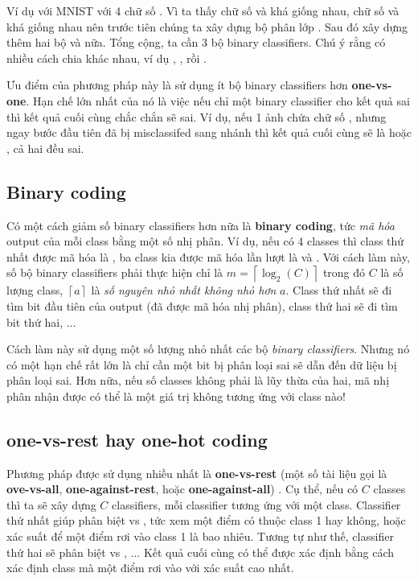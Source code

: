 Ví dụ với MNIST với 4 chữ số . Vì ta thấy chữ số  và  khá giống nhau, chữ số  và  khá giống nhau nên trước tiên chúng ta xây dựng bộ phân lớp . Sau đó xây dựng thêm hai bộ  và  nữa. Tổng cộng, ta cần 3 bộ binary classifiers. Chú ý rằng có nhiều cách chia khác nhau, ví dụ , , rồi .  
 
 
Ưu điểm của phương pháp này là sử dụng ít bộ binary classifiers hơn \textbf{one-vs-one}.  
Hạn chế lớn nhất của nó là việc nếu chỉ một binary classifier cho kết quả sai thì kết quả cuối cùng chắc chắn sẽ sai. Ví dụ, nếu 1 ảnh chứa chữ số , nhưng ngay bước đầu tiên đã bị misclassifed sang nhánh \pythoninline{[4, 7]} thì kết quả cuối cùng sẽ là  hoặc , cả hai đều sai.  
 
 
\subsection{Binary coding}
Có một cách giảm số binary classifiers hơn nữa là \textbf{binary coding}, tức \textit{mã hóa} output của mỗi class bằng một số nhị phân. Ví dụ, nếu có 4 classes thì class thứ nhất được mã hóa là , ba class kia được mã hóa lần lượt là  và . Với cách làm này, số bộ binary classifiers phải thực hiện chỉ là $m = \left\lceil\log_2(C)\right\rceil$ trong đó $C$ là số lượng class, $\left\lceil a \right\rceil$ là \textit{số nguyên nhỏ nhất không nhỏ hơn} $a$. Class thứ nhất sẽ đi tìm bit đầu tiên của output (đã được mã hóa nhị phân), class thứ hai sẽ đi tìm bit thứ hai, ... 
 
Cách làm này sử dụng một số lượng nhỏ nhất các bộ \textit{binary classifiers}. Nhưng nó có một hạn chế rất lớn là chỉ cần một bit bị phân loại sai sẽ dẫn đến dữ liệu bị phân loại sai. Hơn nữa, nếu số classes không phải là lũy thừa của hai, mã nhị phân nhận được có thể là một giá trị không tương ứng với class nào! 
 
 
\subsection{one-vs-rest hay one-hot coding}
Phương pháp được sử dụng nhiều nhất là \textbf{one-vs-rest} (một số tài liệu gọi là \textbf{ove-vs-all}, \textbf{one-against-rest}, hoặc \textbf{one-against-all}) . Cụ thể, nếu có $C$ classes thì ta sẽ xây dựng $C$ classifiers, mỗi classifier tương ứng với một class. Classifier thứ nhất giúp phân biệt  vs , tức xem một điểm có thuộc class 1 hay không, hoặc xác suất để một điểm rơi vào class 1 là bao nhiêu. Tương tự như thế, classifier thứ hai sẽ phân biệt  vs , ... Kết quả cuối cùng có thể được xác định bằng cách xác định class mà một điểm rơi vào với xác suất cao nhất.  
 
